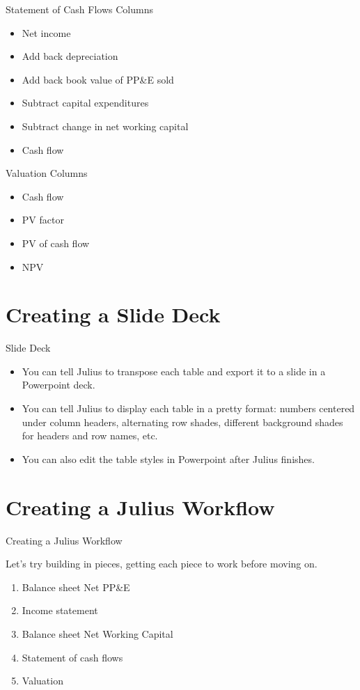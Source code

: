 \documentclass[10pt]{beamer}
\begin{document}
\begin{frame}{Statement of Cash Flows Columns}
    \begin{itemize}
        \item Net income
        \item Add back depreciation
        \item Add back book value of PP\&E sold
        \item Subtract capital expenditures
        \item Subtract change in net working capital
        \item Cash flow
    \end{itemize}
\end{frame}

\begin{frame}{Valuation Columns}
    \begin{itemize}
        \item Cash flow
        \item PV factor
        \item PV of cash flow
        \item NPV
    \end{itemize}
\end{frame}


\section{Creating a Slide Deck}

\begin{frame}{Slide Deck}
    \begin{itemize}
        \item You can tell Julius to transpose each table and export it to a slide in a Powerpoint deck.
        \item You can tell Julius to display each table in a pretty format: numbers centered under column headers, alternating row shades, different background shades for headers and row names, etc.
        \item You can also edit the table styles in Powerpoint after Julius finishes.
    \end{itemize}
\end{frame}

\section{Creating a Julius Workflow}

\begin{frame}{Creating a Julius Workflow}
 
    Let's try building in pieces, getting each piece to work before moving on.
    \begin{enumerate} 
        \item Balance sheet Net PP\&E
        \item Income statement 
        \item Balance sheet Net Working Capital
        \item Statement of cash flows
        \item Valuation 
    \end{enumerate}
\end{frame}
\end{document}
